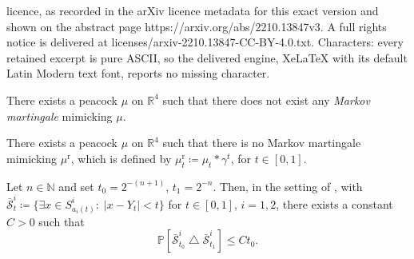 \documentclass[10pt,a4paper]{amsart}
\def\P{{\mathbb P}}
\newcommand{\N}{\mathbb N}
\newcommand{\R}{\mathbb R}
\newcommand{\Sccc}{\bar{\mathcal S}}
\newcommand{\reg}{\mathrm{r}}
\begin{document}
licence, as recorded in the arXiv licence metadata for this exact version and shown on the abstract page https://arxiv.org/abs/2210.13847v3. A full rights notice is delivered at licenses/arxiv-2210.13847-CC-BY-4.0.txt. Characters: every retained excerpt is pure ASCII, so the delivered engine, XeLaTeX with its default Latin Modern text font, reports no missing character.
\begin{proposition}\label{prop:ex-discontinuous}
	There exists a peacock $\mu$ on $\R^4$ such that there does not exist any \emph{Markov martingale} mimicking $\mu$.
\end{proposition}

\begin{proposition}\label{prop:ex-regularized}
	There exists a peacock $\mu$ on $\R^4$ such that there is no Markov martingale mimicking $\mu^\reg$, which is defined by $\mu^\reg_t \coloneqq \mu_t \ast \gamma^{t}$, for $t \in [0, 1]$.
\end{proposition}

\begin{lemma}\label{lem:app-reg}
	Let $n \in \N$ and set $t_0 = 2^{-(n+1)}$, $t_1 = 2^{-n}$. Then, in the setting of , with $\Sccc^i_{t} \coloneqq \{\exists x \in S^i_{a_i(t)} \colon \; |x - Y_t| < t \}$ for $t \in [0, 1]$, $i = 1,2$, there exists a constant $C > 0$ such that
	   \begin{equation}
    	    \P[\Sccc^i_{t_0} \bigtriangleup \Sccc^i_{t_1}] \le C t_0.
	   \end{equation}
\end{lemma}
\end{document}

